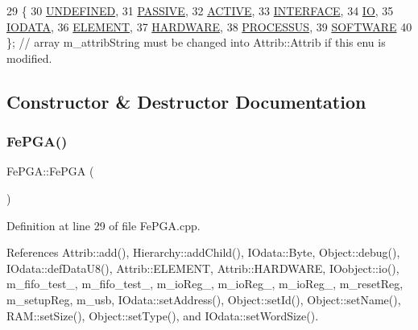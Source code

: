 \begin{DoxyCode}
29                 \{
30     \hyperlink{classAttrib_a69e171d7cc6417835a5a306d3c764235a3a8da2ab97dda18aebab196fe4100531}{UNDEFINED},
31     \hyperlink{classAttrib_a69e171d7cc6417835a5a306d3c764235a2bfb2af57b87031d190a05fe25dd92ed}{PASSIVE},
32     \hyperlink{classAttrib_a69e171d7cc6417835a5a306d3c764235a3b1fec929c0370d1436f2f06e298fb0d}{ACTIVE},
33     \hyperlink{classAttrib_a69e171d7cc6417835a5a306d3c764235aa27c16b480a369ea4d18b07b2516bbc7}{INTERFACE},
34     \hyperlink{classAttrib_a69e171d7cc6417835a5a306d3c764235a1420a5b8c0540b2af210b6975eded7f9}{IO},
35     \hyperlink{classAttrib_a69e171d7cc6417835a5a306d3c764235a0af3b0d0ac323c1704e6c69cf90add28}{IODATA},
36     \hyperlink{classAttrib_a69e171d7cc6417835a5a306d3c764235a7788bc5dd333fd8ce18562b269c9dab1}{ELEMENT},
37     \hyperlink{classAttrib_a69e171d7cc6417835a5a306d3c764235a61ceb22149f365f1780d18f9d1459423}{HARDWARE},
38     \hyperlink{classAttrib_a69e171d7cc6417835a5a306d3c764235a75250e29692496e73effca2c0330977f}{PROCESSUS},
39     \hyperlink{classAttrib_a69e171d7cc6417835a5a306d3c764235a103a67cd0b8f07ef478fa45d4356e27b}{SOFTWARE} 
40   \}; \textcolor{comment}{// array m\_attribString must be changed into Attrib::Attrib if this enu is modified. }
\end{DoxyCode}


\subsection{Constructor \& Destructor Documentation}
\mbox{\label{classFePGA_a377ae8860fbb3162e0c49dd08197a670}} 
\subsubsection{\texorpdfstring{Fe\+P\+G\+A()}{FePGA()}}
{\footnotesize\ttfamily Fe\+P\+G\+A\+::\+Fe\+P\+GA (\begin{DoxyParamCaption}{ }\end{DoxyParamCaption})}



Definition at line 29 of file Fe\+P\+G\+A.\+cpp.



References Attrib\+::add(), Hierarchy\+::add\+Child(), I\+Odata\+::\+Byte, Object\+::debug(), I\+Odata\+::def\+Data\+U8(), Attrib\+::\+E\+L\+E\+M\+E\+NT, Attrib\+::\+H\+A\+R\+D\+W\+A\+RE, I\+Oobject\+::io(), m\+\_\+fifo\+\_\+test\+\_, m\+\_\+fifo\+\_\+test\+\_, m\+\_\+io\+Reg\+\_, m\+\_\+io\+Reg\+\_, m\+\_\+io\+Reg\+\_, m\+\_\+reset\+Reg, m\+\_\+setup\+Reg, m\+\_\+usb, I\+Odata\+::set\+Address(), Object\+::set\+Id(), Object\+::set\+Name(), R\+A\+M\+::set\+Size(), Object\+::set\+Type(), and I\+Odata\+::set\+Word\+Size().


